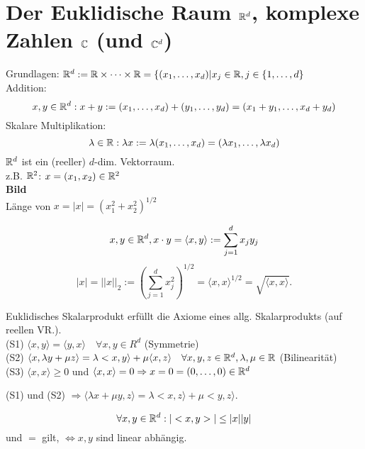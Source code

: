 \documentclass[../ana1.tex]{subfiles}
\begin{document}
\setcounter{section}{11}

\section{Der Euklidische Raum \( \mathbb{R}^d \), komplexe Zahlen \( \mathbb{C} \) (und \(\mathbb{C}^d \))}
Grundlagen: \( \mathbb{R}^d := \mathbb{R} \times \cdots \times \mathbb{R} = \{ (x_1, \dots, x_d) | x_j \in\mathbb{R}, j\in \{1,\dots, d \} \)\\
Addition:
\[x, y \in \mathbb{R}^d: x + y := (x_1, \dots , x_d) + (y_1, \dots, y_d) = (x_1 + y_1, \dots, x_d + y_d) \]
Skalare Multiplikation:
\[\lambda \in \mathbb{R}: \lambda x := \lambda(x_1, \dots , x_d) = (\lambda x_1, \dots, \lambda x_d) \]
\( \mathbb{R}^d \) ist ein (reeller) \(d\)-dim. Vektorraum.\\
z.B. \(\mathbb{R}^2\): \(x = (x_1, x_2) \in \mathbb{R}^2\)\\
\textbf{Bild}\\%
Länge von \(x = |x| = {(x_1^2 + x_2^2)^{1/2}}\)
\begin{defi}
	\[ x,y \in\mathbb{R}^d, x\cdot y = \langle x,y\rangle := \sum_{j=1}^{d}x_j y_j \]
	\[ |x| = ||x||_2 := (\sum_{j=1}^{d} x_j^2 )^{1/2} = \langle x,x\rangle^{1/2} = \sqrt{\langle x,x\rangle}. \]
\end{defi}
\begin{bem}
	Euklidisches Skalarprodukt erfüllt die Axiome eines allg. Skalarprodukts (auf reellen VR.).\\
	(S1) \( \langle x,y\rangle = \langle y,x\rangle \quad\forall x,y\in R^d \) (Symmetrie)\\
	(S2) \( \langle x, \lambda y + \mu z\rangle = \lambda <x,y\rangle + \mu\langle x,z\rangle \quad \forall x,y,z\in\mathbb{R}^d, \lambda, \mu \in\mathbb{R} \) (Bilinearität)\\
	(S3) \( \langle x,x\rangle \geq 0 \) und \( \langle x,x\rangle = 0 \Rightarrow x=0 = (0,\dots,0) \in\mathbb{R}^d \)
\end{bem}
\begin{bem}
	(S1) und (S2) \( \Rightarrow \langle\lambda x + \mu y, z\rangle = \lambda <x,z\rangle + \mu <y,z\rangle \).
\end{bem}
\begin{satz}
	\[ \forall x,y\in\mathbb{R}^d: |<x,y>|\leq |x||y|\]
	und \glqq\(=\)\grqq{} gilt, \( \Leftrightarrow x,y \) sind linear abhängig.
\end{satz}
\end{document}
